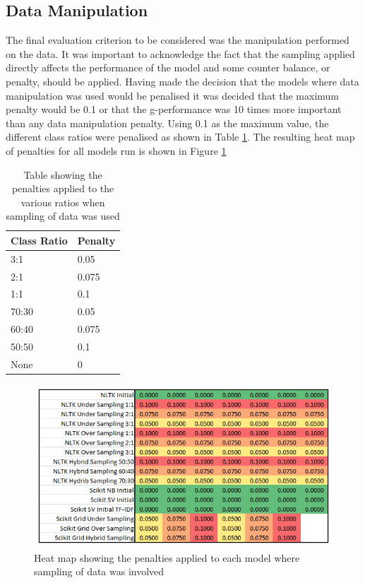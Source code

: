 \subsection{Data Manipulation}
 
The final evaluation criterion to be considered was the manipulation performed on the data. It was important to acknowledge the fact that the sampling applied directly affects the performance of the model and some counter balance, or penalty, should be applied. Having made the decision that the models where data manipulation was used would be penalised it was decided that the maximum penalty would be 0.1 or that the g-performance was 10 times more important than any data manipulation penalty. Using 0.1 as the maximum value, the different class ratios were penalised as shown in Table \ref{tab:chapter5:ratio_penalty}. The resulting heat map of penalties for all models run is shown in Figure \ref{fig:best_model_03}

\begin{table}[h]
	\centering
	\caption[Penalties assigned for sampling]{Table showing the penalties applied to the various ratios when sampling of data was used}
	\label{tab:chapter5:ratio_penalty}
	\begin{tabular}{ll}
		\toprule
		\textbf{Class Ratio}& \textbf{Penalty}    \\
		\midrule
		3:1 & 0.05   \\
		2:1 & 0.075   \\
		1:1 & 0.1   \\
		70:30 & 0.05   \\
		60:40 & 0.075   \\
		50:50 & 0.1   \\
		None & 0   \\
		\bottomrule
    \end{tabular}
\end{table}

\begin{figure}[htbp]
	\centering
	\includegraphics[width=1\textwidth]{Figures/Chapter5/best_model_03.jpg}
	\caption[Best Model - Data Manipulation Penalties]{Heat map showing the penalties applied to each model where sampling of data was involved}
	\label{fig:best_model_03}
\end{figure}

